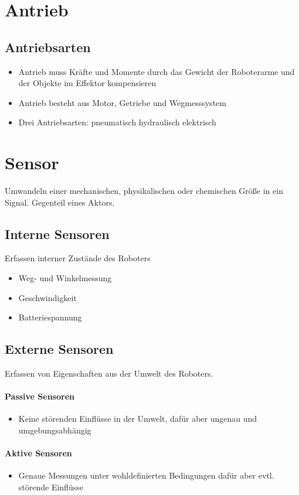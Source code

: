 \section{Antrieb}
\subsection{Antriebsarten}
\begin{itemize}
	\item Antrieb muss Kräfte und Momente durch das Gewicht der Roboterarme und der Objekte im Effektor kompensieren
	\item Antrieb besteht aus Motor, Getriebe und Wegmesssystem
	\item Drei Antriebsarten:
	\subitem pneumatisch
	\subitem hydraulisch
	\subitem elektrisch
\end{itemize}
\section{Sensor}
Umwandeln einer mechanischen, physikalischen oder chemischen Größe in ein Signal.
Gegenteil eines Aktors.
\subsection{Interne Sensoren} Erfassen interner Zustände des Roboters
\begin{itemize}
	\item Weg- und Winkelmessung
	\item Geschwindigkeit
	\item Batteriespannung
\end{itemize}
\subsection{Externe Sensoren}
Erfassen von Eigenschaften aus der Umwelt des Roboters.
\paragraph{Passive Sensoren}
\begin{itemize}
	\item Keine störenden Einflüsse in der Umwelt, dafür aber ungenau und umgebungsabhängig
\end{itemize}
\paragraph{Aktive Sensoren}
\begin{itemize}
	\item Genaue Messungen unter wohldefinierten Bedingungen dafür aber evtl. störende Einflüsse
\end{itemize}
